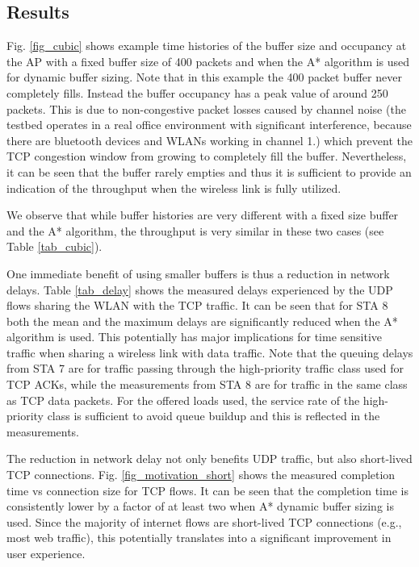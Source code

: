 \documentclass[10pt,twocolumn, journal]{IEEEtran}
\begin{document}
\subsection{Results}

Fig. \ref{fig_cubic} shows example time histories of the buffer size and occupancy at the AP with a fixed buffer size
of 400 packets and when the A* algorithm is used for dynamic buffer sizing.  Note that in this example the 400 packet
buffer never completely fills. Instead the buffer occupancy has a peak value of around 250 packets.  This is due to
non-congestive packet losses caused by channel noise (the testbed operates in a real office environment with
significant interference, because there are bluetooth devices and WLANs working in channel 1.) which prevent the TCP congestion window from growing to completely fill the buffer. Nevertheless, it can be seen that the buffer rarely empties and thus it is sufficient to provide an indication of the throughput when the wireless link is fully utilized.

We observe that while buffer histories are very different with a fixed size buffer and the A* algorithm, the throughput is very similar in these two cases (see Table \ref{tab_cubic}).

One immediate benefit of using smaller buffers is thus a reduction in network delays.
Table \ref{tab_delay} shows the measured delays experienced by the UDP flows sharing the WLAN
with the TCP traffic.  It can be seen that for STA 8 both the mean and the maximum delays are
significantly reduced when the A* algorithm is used. This potentially has major
implications for time sensitive traffic when sharing a wireless link with data traffic. Note that the queuing delays from STA 7 are for traffic passing through the high-priority traffic class used for TCP ACKs, while the measurements from STA 8 are for traffic in the same class as TCP data packets.  For the offered loads used, the service rate of the high-priority class is sufficient to avoid queue buildup and this is reflected in the measurements.


The reduction in network delay not only benefits UDP traffic, but also short-lived TCP
connections.   Fig. \ref{fig_motivation_short} shows the measured completion time vs
connection size for TCP flows.  It can be seen that the completion time is consistently lower by a factor of at least two when A* dynamic buffer sizing is used. Since the majority
of internet flows are short-lived TCP connections (e.g., most web traffic), this
potentially translates into a significant improvement in user experience.
\end{document}
